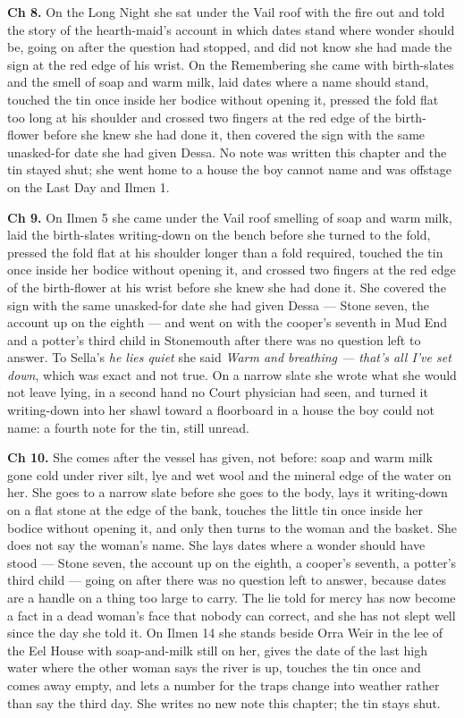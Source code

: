 \documentclass{design/chronicle}
\begin{document}
{\textbf{Ch 8.} On the Long Night she sat under the Vail roof with the fire out and told the story of the hearth-maid’s account in which dates stand where wonder should be, going on after the question had stopped, and did not know she had made the sign at the red edge of his wrist. On the Remembering she came with birth-slates and the smell of soap and warm milk, laid dates where a name should stand, touched the tin once inside her bodice without opening it, pressed the fold flat too long at his shoulder and crossed two fingers at the red edge of the birth-flower before she knew she had done it, then covered the sign with the same unasked-for date she had given Dessa. No note was written this chapter and the tin stayed shut; she went home to a house the boy cannot name and was offstage on the Last Day and Ilmen 1.

\textbf{Ch 9.} On Ilmen 5 she came under the Vail roof smelling of soap and warm milk, laid the birth-slates writing-down on the bench before she turned to the fold, pressed the fold flat at his shoulder longer than a fold required, touched the tin once inside her bodice without opening it, and crossed two fingers at the red edge of the birth-flower at his wrist before she knew she had done it. She covered the sign with the same unasked-for date she had given Dessa --- Stone seven, the account up on the eighth --- and went on with the cooper’s seventh in Mud End and a potter’s third child in Stonemouth after there was no question left to answer. To Sella’s \emph{he lies quiet} she said \emph{Warm and breathing --- that’s all I’ve set down}, which was exact and not true. On a narrow slate she wrote what she would not leave lying, in a second hand no Court physician had seen, and turned it writing-down into her shawl toward a floorboard in a house the boy could not name: a fourth note for the tin, still unread.

\textbf{Ch 10.} She comes after the vessel has given, not before: soap and warm milk gone cold under river silt, lye and wet wool and the mineral edge of the water on her. She goes to a narrow slate before she goes to the body, lays it writing-down on a flat stone at the edge of the bank, touches the little tin once inside her bodice without opening it, and only then turns to the woman and the basket. She does not say the woman’s name. She lays dates where a wonder should have stood --- Stone seven, the account up on the eighth, a cooper’s seventh, a potter’s third child --- going on after there was no question left to answer, because dates are a handle on a thing too large to carry. The lie told for mercy has now become a fact in a dead woman’s face that nobody can correct, and she has not slept well since the day she told it. On Ilmen 14 she stands beside Orra Weir in the lee of the Eel House with soap-and-milk still on her, gives the date of the last high water where the other woman says the river is up, touches the tin once and comes away empty, and lets a number for the traps change into weather rather than say the third day. She writes no new note this chapter; the tin stays shut.

}
\end{document}

